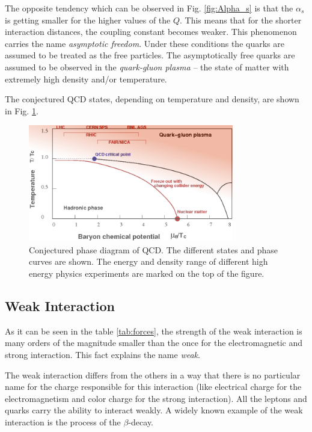 The opposite tendency which can be observed in Fig. \ref{fig:Alpha_s} is that the $\alpha_{s}$ is getting smaller for the higher values 
of the $Q$. This means that for the shorter interaction distances, the coupling constant becomes weaker. This phenomenon carries the 
name \textit{asymptotic freedom}. Under these conditions the quarks are assumed to be treated as the free particles. The asymptotically 
free quarks are assumed to be observed in the \textit{quark-gluon plasma} \cite{Bohr1977275} -- the state of matter with extremely high density and/or temperature.

The conjectured QCD states, depending on temperature and density, are shown in Fig. \ref{fig:QGP}.

\begin{figure}[t]
  \centering
  \includegraphics[width=0.8\textwidth]{01_Theory_SM/plots/QGP.png}
  \caption{Conjectured phase diagram of QCD. The different states and phase curves are shown. The energy and density range of different high energy 
  physics experiments are marked on the top of the figure.}
  \label{fig:QGP}
\end{figure}

\subsection{Weak Interaction}

As it can be seen in the table \ref{tab:forces}, the strength of the weak interaction is many orders of the magnitude smaller than the once for the 
electromagnetic and strong interaction. This fact explains the name \textit{weak}.

The weak interaction differs from the others in a way that there is no particular name for the charge responsible for this interaction 
(like electrical charge for the electromagnetism and color charge for the strong interaction). All the leptons and quarks carry the ability to interact
weakly. A widely known example of the weak interaction is the process of the $\beta$-decay.

